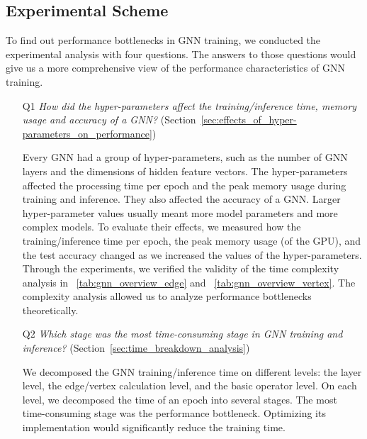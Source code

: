 \subsection{Experimental Scheme}
\label{sec:experimental_scheme}

To find out performance bottlenecks in GNN training, we conducted the experimental analysis with four questions.
%
The answers to those questions would give us a more comprehensive view of the performance characteristics of GNN training.

\begin{itemize}

    \item[Q1] \emph{How did the hyper-parameters affect the training/inference time, memory usage and accuracy of a GNN?} (Section~\ref{sec:effects_of_hyper-parameters_on_performance})

          Every GNN had a group of hyper-parameters, such as the number of GNN layers and the dimensions of hidden feature vectors.
          The hyper-parameters affected the processing time per epoch and the peak memory usage during training and inference.
          They also affected the accuracy of a GNN.
          Larger hyper-parameter values usually meant more model parameters and more complex models.
          To evaluate their effects, we measured how the training/inference time per epoch, the peak memory usage (of the GPU), and the test accuracy changed as we increased the values of the hyper-parameters.
          Through the experiments, we verified the validity of the time complexity analysis in \tablename~\ref{tab:gnn_overview_edge} and \tablename~\ref{tab:gnn_overview_vertex}.
          The complexity analysis allowed us to analyze performance bottlenecks theoretically.

    \item[Q2] \emph{Which stage was the most time-consuming stage in GNN training and inference?} (Section~\ref{sec:time_breakdown_analysis})

          We decomposed the GNN training/inference time on different levels: the layer level, the edge/vertex calculation level, and the basic operator level.
          On each level, we decomposed the time of an epoch into several stages.
          The most time-consuming stage was the performance bottleneck.
          Optimizing its implementation would significantly reduce the training time.


\end{itemize}
